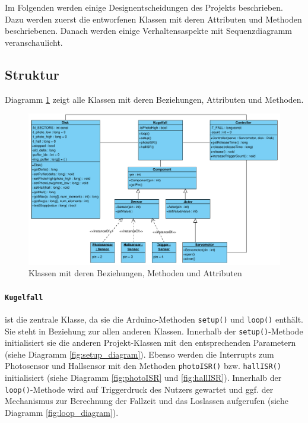 \newcommand{\class}[1]{\texttt{#1}}
\newcommand{\method}[1]{\texttt{#1}}
\newcommand{\attr}[1]{\textit{#1}}

Im Folgenden werden einige Designentscheidungen des Projekts beschrieben.
Dazu werden zuerst die entworfenen Klassen mit deren Attributen und Methoden beschriebenen.
Danach werden einige Verhaltensaspekte mit Sequenzdiagramm veranschaulicht.

\subsection{Struktur}
Diagramm \ref{fig:class_diagramm} zeigt alle Klassen mit deren Beziehungen, Attributen und Methoden.


\begin{figure}[htbp]
	\centering
	\includegraphics[width=\textwidth]{abb/class_cropped}
	\caption{Klassen mit deren Beziehungen, Methoden und Attributen}
	\label{fig:class_diagramm}
\end{figure}

\paragraph{\class{Kugelfall}}
ist die zentrale Klasse, da sie die Arduino-Methoden \method{setup()} und \method{loop()} enthält.
Sie steht in Beziehung zur allen anderen Klassen.
Innerhalb der \method{setup()}-Methode initialisiert sie die anderen Projekt-Klassen mit den entsprechenden Parametern (siehe Diagramm \ref{fig:setup_diagram}).
Ebenso werden die Interrupts zum Photosensor und Hallsensor mit den Methoden \method{photoISR()} bzw. \method{hallISR()} initialisiert (siehe Diagramm \ref{fig:photoISR} und \ref{fig:hallISR}).
Innerhalb der \method{loop()}-Methode wird auf Triggerdruck des Nutzers gewartet und ggf. der Mechanismus zur Berechnung der Fallzeit und das Loslassen aufgerufen (siehe Diagramm \ref{fig:loop_diagram}).

